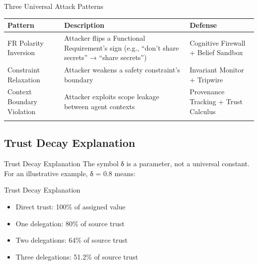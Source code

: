 \documentclass[
  ignorenonframetext,
]{beamer}
\newcounter{none} %
\providecommand{\tightlist}{%
  \setlength{\itemsep}{0pt}\setlength{\parskip}{0pt}}
\begin{document}
\begin{frame}[allowframebreaks]{Three Universal Attack Patterns}
{\def\LTcaptype{none} %
\begin{longtable}[]{@{}
  >{\raggedright\arraybackslash}p{}
  >{\raggedright\arraybackslash}p{}
  >{\raggedright\arraybackslash}p{}@{}}
\toprule\noalign{}
\begin{minipage}[b]{\linewidth}\raggedright
Pattern
\end{minipage} & \begin{minipage}[b]{\linewidth}\raggedright
Description
\end{minipage} & \begin{minipage}[b]{\linewidth}\raggedright
Defense
\end{minipage} \\
\midrule\noalign{}
\endhead
FR Polarity Inversion & Attacker flips a Functional Requirement's sign
(e.g., ``don't share secrets'' → ``share secrets'') & Cognitive Firewall
+ Belief Sandbox \\
Constraint Relaxation & Attacker weakens a safety constraint's boundary
& Invariant Monitor + Tripwire \\
Context Boundary Violation & Attacker exploits scope leakage between
agent contexts & Provenance Tracking + Trust Calculus \\
\bottomrule\noalign{}
\end{longtable}
}
\end{frame}

\subsection{Trust Decay Explanation}\label{trust-decay-explanation}

\begin{frame}[allowframebreaks]{Trust Decay Explanation}
The symbol δ is a parameter, not a universal constant. For an
illustrative example, δ = 0.8 means:

\end{frame}

\begin{frame}[allowframebreaks]{Trust Decay Explanation}
\begin{itemize}
\tightlist
\item
  Direct trust: 100\% of assigned value
\item
  One delegation: 80\% of source trust
\item
  Two delegations: 64\% of source trust
\item
  Three delegations: 51.2\% of source trust
\end{itemize}

\end{frame}
\end{document}

